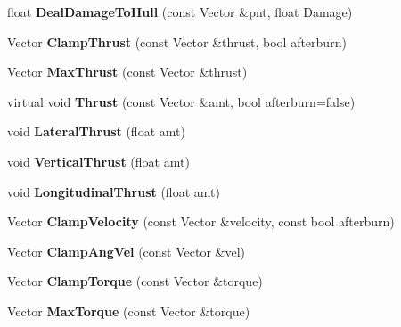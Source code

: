 \begin{DoxyCompactItemize}
\item 
float {\bfseries Deal\+Damage\+To\+Hull} (const Vector \&pnt, float Damage)\hypertarget{classUnit_abe3aab0ac5c4d9da922d754322ac6fc0}{}\label{classUnit_abe3aab0ac5c4d9da922d754322ac6fc0}

\item 
Vector {\bfseries Clamp\+Thrust} (const Vector \&thrust, bool afterburn)\hypertarget{classUnit_a8ac5b68f080ebeafc4f41b86869dc951}{}\label{classUnit_a8ac5b68f080ebeafc4f41b86869dc951}

\item 
Vector {\bfseries Max\+Thrust} (const Vector \&thrust)\hypertarget{classUnit_a8362b3ed87b61c4d19ee022478660894}{}\label{classUnit_a8362b3ed87b61c4d19ee022478660894}

\item 
virtual void {\bfseries Thrust} (const Vector \&amt, bool afterburn=false)\hypertarget{classUnit_ab2d5ee1ad870b46b36769501d8fd894b}{}\label{classUnit_ab2d5ee1ad870b46b36769501d8fd894b}

\item 
void {\bfseries Lateral\+Thrust} (float amt)\hypertarget{classUnit_a2490f28845172c33d229ae03eefcf009}{}\label{classUnit_a2490f28845172c33d229ae03eefcf009}

\item 
void {\bfseries Vertical\+Thrust} (float amt)\hypertarget{classUnit_a283e3687734cc04a0424d6fd1f01c1ae}{}\label{classUnit_a283e3687734cc04a0424d6fd1f01c1ae}

\item 
void {\bfseries Longitudinal\+Thrust} (float amt)\hypertarget{classUnit_a48f715c3bba0db72bc48d8b1869b2cba}{}\label{classUnit_a48f715c3bba0db72bc48d8b1869b2cba}

\item 
Vector {\bfseries Clamp\+Velocity} (const Vector \&velocity, const bool afterburn)\hypertarget{classUnit_a5549b36c03bbd6bbba7fdf57ac2f8b4d}{}\label{classUnit_a5549b36c03bbd6bbba7fdf57ac2f8b4d}

\item 
Vector {\bfseries Clamp\+Ang\+Vel} (const Vector \&vel)\hypertarget{classUnit_a79e3d3a4b213e117205e24ae0f2b6142}{}\label{classUnit_a79e3d3a4b213e117205e24ae0f2b6142}

\item 
Vector {\bfseries Clamp\+Torque} (const Vector \&torque)\hypertarget{classUnit_a11c36ec7c746292bf042097cd7ad0b54}{}\label{classUnit_a11c36ec7c746292bf042097cd7ad0b54}

\item 
Vector {\bfseries Max\+Torque} (const Vector \&torque)\hypertarget{classUnit_a49ca8dfe7ad1c52bbda0eda54d579147}{}\label{classUnit_a49ca8dfe7ad1c52bbda0eda54d579147}


\end{DoxyCompactItemize}
